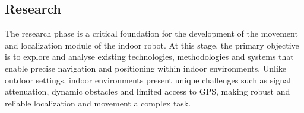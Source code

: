 \subsection{Research}

The research phase is a critical foundation for the development of the movement and localization module of the indoor robot. At this stage, the primary objective is to explore and analyse existing technologies, methodologies and systems that enable precise navigation and positioning within indoor environments. Unlike outdoor settings, indoor environments present unique challenges such as signal attenuation, dynamic obstacles and limited access to GPS, making robust and reliable localization and movement a complex task.
